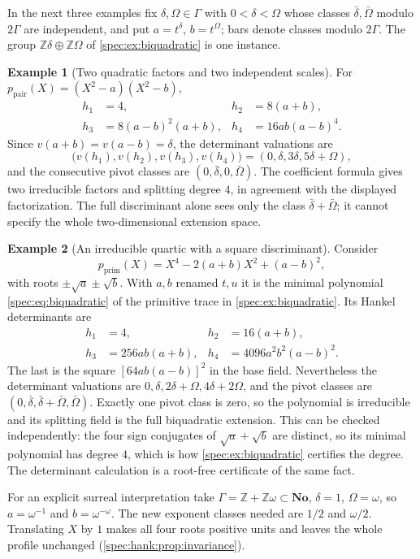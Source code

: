 \documentclass[11pt,a4paper]{article}
\numberwithin{equation}{section}
\theoremstyle{definition}
\newtheorem{example}[example]{Example}
\theoremstyle{remark}
\newcommand{\No}{\mathbf{No}}
\newcommand{\Z}{\mathbb Z}
\begin{document}
In the next three examples fix $\delta,\Omega\in\Gamma$ with
$0<\delta<\Omega$ whose classes $\bar\delta,\bar\Omega$ modulo $2\Gamma$ are
independent, and put $a=t^\delta$, $b=t^\Omega$; bars denote classes modulo
$2\Gamma$. The group $\Z\delta\oplus\Z\Omega$ of \cref{spec:ex:biquadratic}
is one instance.

\begin{example}[Two quadratic factors and two independent scales]\label{spec:hank:ex:pair}
For $p_{\mathrm{pair}}(X)=(X^2-a)(X^2-b)$,
\begin{align*}
 h_1&=4,&h_2&=8(a+b),\\
 h_3&=8(a-b)^2(a+b),&h_4&=16ab(a-b)^4.
\end{align*}
Since $v(a+b)=v(a-b)=\delta$, the determinant valuations are
\[
 \bigl(v(h_1),v(h_2),v(h_3),v(h_4)\bigr)=(0,\delta,3\delta,5\delta+\Omega),
\]
and the consecutive pivot classes are $(0,\bar\delta,0,\bar\Omega)$. The coefficient formula gives
two irreducible factors and splitting degree $4$, in agreement with the
displayed factorization. The full discriminant alone sees only the class
$\bar\delta+\bar\Omega$; it cannot specify the whole two-dimensional
extension space.
\end{example}

\begin{example}[An irreducible quartic with a square discriminant]\label{spec:hank:ex:quartic}
Consider
\[
 p_{\mathrm{prim}}(X)=X^4-2(a+b)X^2+(a-b)^2,
\]
with roots $\pm\sqrt a\pm\sqrt b$. With $a,b$ renamed $t,u$ it is the
minimal polynomial \eqref{spec:eq:biquadratic} of the primitive trace in
\cref{spec:ex:biquadratic}. Its Hankel determinants are
\begin{align*}
 h_1&=4,&h_2&=16(a+b),\\
 h_3&=256ab(a+b),&h_4&=4096a^2b^2(a-b)^2.
\end{align*}
The last is the square $[64ab(a-b)]^2$ in the base field. Nevertheless the
determinant valuations are $0,\delta,2\delta+\Omega,4\delta+2\Omega$, and the
pivot classes are $(0,\bar\delta,\bar\delta+\bar\Omega,\bar\Omega)$. Exactly one
pivot class is zero, so the polynomial is irreducible and its splitting field
is the full biquadratic extension. This can be checked independently: the
four sign conjugates of $\sqrt a+\sqrt b$ are distinct, so its minimal
polynomial has degree $4$, which is how \cref{spec:ex:biquadratic} certifies
the degree. The determinant calculation is a root-free certificate of the
same fact.

For an explicit surreal interpretation take $\Gamma=\Z+\Z\omega\subset\No$,
$\delta=1$, $\Omega=\omega$, so $a=\omega^{-1}$ and $b=\omega^{-\omega}$. The
new exponent classes needed are $1/2$ and $\omega/2$. Translating $X$ by $1$
makes all four roots positive units and leaves the whole profile unchanged
(\cref{spec:hank:prop:invariance}).
\end{example}
\end{document}
